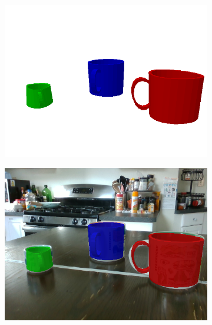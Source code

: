 \documentclass{article}
\begin{document}
\begin{figure}[]
\begin{subfigure}{(\linewidth - 0.05\linewidth)/5}
    \end{subfigure}
    \begin{subfigure}{(\linewidth - 0.05\linewidth)/5}
        \centering
        \includegraphics[width=\linewidth]{figures/real2sim2real/2/3_sim.png}
    \end{subfigure}
    \begin{subfigure}{(\linewidth - 0.05\linewidth)/5}
        \centering
        \includegraphics[width=\linewidth]{figures/real2sim2real/2/3.png}
    \end{subfigure}
    \begin{subfigure}{(\linewidth - 0.05\linewidth)/5}
        \centering

\end{subfigure}
\end{figure}
\end{document}
